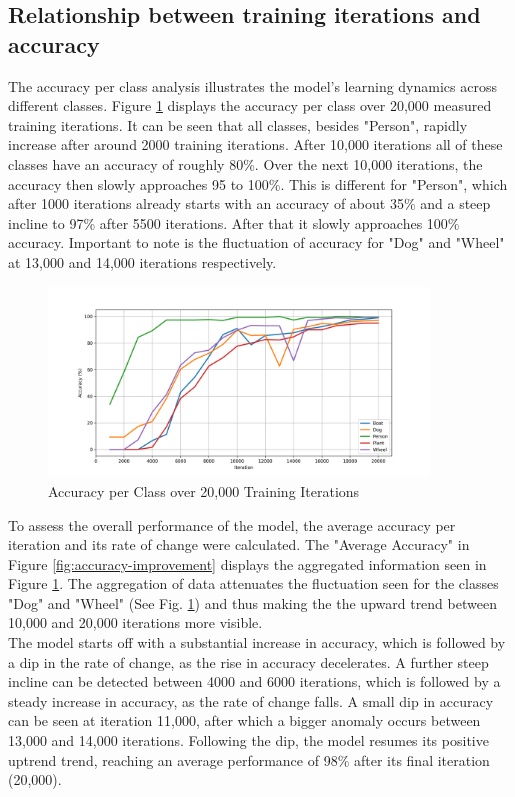 \subsection{Relationship between training iterations and accuracy}
The accuracy per class analysis illustrates the model's learning dynamics across different classes.
Figure \ref{fig:accuracy-vs-training-iterations} displays the accuracy per class over 20,000 measured training iterations.
It can be seen that all classes, besides "Person", rapidly increase after around 2000 training iterations. After 10,000 iterations
all of these classes have an accuracy of roughly 80\%. Over the next 10,000 iterations, the accuracy then slowly approaches 95 to 100\%.
This is different for "Person", which after 1000 iterations already starts with an accuracy of about 35\% and a steep incline to 97\%
after 5500 iterations. After that it slowly approaches 100\% accuracy.
Important to note is the fluctuation of accuracy for "Dog" and "Wheel" at 13,000 and 14,000 iterations respectively.

\begin{figure}[h]
   \centering
   \includegraphics[width=0.9\textwidth]{../Data/accuracy-graph.png}
   \caption{Accuracy per Class over 20,000 Training Iterations}
   \label{fig:accuracy-vs-training-iterations}
\end{figure}


To assess the overall performance of the model, the average accuracy per iteration and its rate of change were calculated.
The "Average Accuracy" in Figure \ref{fig:accuracy-improvement} displays the aggregated information seen in Figure 
\ref{fig:accuracy-vs-training-iterations}. The aggregation of data attenuates the fluctuation seen for the classes "Dog" and "Wheel" 
(See Fig. \ref{fig:accuracy-vs-training-iterations}) and thus making the the upward trend between 10,000 and 20,000 iterations more visible.
\\
The model starts off with a substantial increase in accuracy, which is followed by a dip in the rate of change, as the rise in accuracy 
decelerates. A further steep incline can be detected between 4000 and 6000 iterations, which is followed by a steady increase in accuracy, as
the rate of change falls. A small dip in accuracy can be seen at iteration 11,000, after which a bigger anomaly occurs between 13,000
and 14,000 iterations. Following the dip, the model resumes its positive uptrend trend, reaching an average performance of 98\% after its final
iteration (20,000).
\newpage


